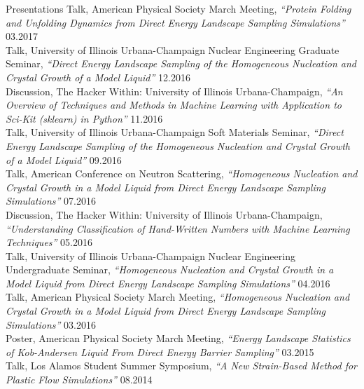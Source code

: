 \documentclass[9pt]{resume} %
\begin{document}
\begin{rSection}{Presentations}
	Talk, American Physical Society March Meeting, {\it{``Protein Folding and Unfolding Dynamics from Direct Energy Landscape Sampling Simulations''}} \hfill{03.2017}
	\\[5pt]
	Talk, University of Illinois Urbana-Champaign Nuclear Engineering Graduate Seminar, {\it{``Direct Energy Landscape Sampling of the Homogeneous Nucleation and Crystal Growth of a Model Liquid''}} \hfill {12.2016}
	\\[5pt]
	Discussion, The Hacker Within: University of Illinois Urbana-Champaign, {\it{``An Overview of Techniques and Methods in Machine Learning with Application to Sci-Kit (sklearn) in Python''}} \hfill {11.2016}
	\\[5pt]
	Talk, University of Illinois Urbana-Champaign Soft Materials Seminar, {\it{``Direct Energy Landscape Sampling of the Homogeneous Nucleation and Crystal Growth of a Model Liquid''}} \hfill {09.2016}
	\\[5pt]
	Talk, American Conference on Neutron Scattering, {\it{``Homogeneous Nucleation and Crystal Growth in a Model Liquid from Direct Energy Landscape Sampling Simulations''}} \hfill {07.2016}
	\\[5pt]
	Discussion, The Hacker Within: University of Illinois Urbana-Champaign, {\it{``Understanding Classification of Hand-Written Numbers with Machine Learning Techniques''}} \hfill {05.2016}
	\\[5pt]
	Talk, University of Illinois Urbana-Champaign Nuclear Engineering Undergraduate Seminar, {\it{``Homogeneous Nucleation and Crystal Growth in a Model Liquid from Direct Energy Landscape Sampling Simulations''}} \hfill {04.2016} 
	\\[5pt]
	Talk, American Physical Society March Meeting, {\it{``Homogeneous Nucleation and Crystal Growth in a Model Liquid from Direct Energy Landscape Sampling Simulations''}} \hfill {03.2016}
	\\[5pt]
	Poster, American Physical Society March Meeting, {\it{``Energy Landscape Statistics of Kob-Andersen Liquid From Direct Energy Barrier Sampling''}} \hfill {03.2015}
	\\[5pt]
	Talk, Los Alamos Student Summer Symposium, {\it{``A New Strain-Based Method for Plastic Flow Simulations''}} \hfill {08.2014} \\
\end{rSection}
\end{document}
